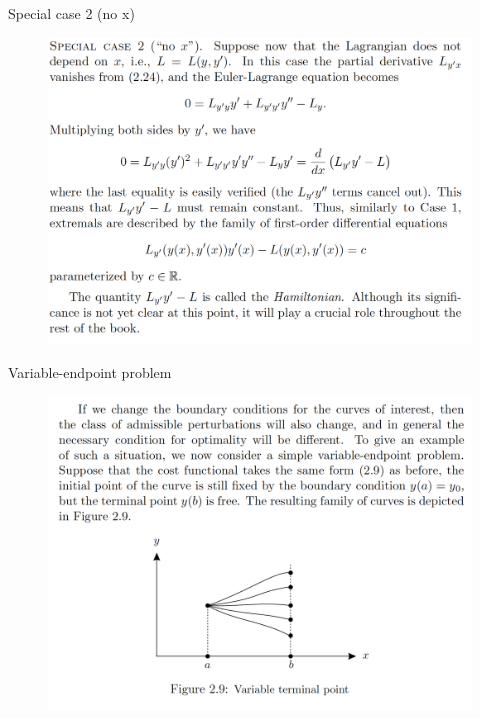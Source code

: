 \documentclass{beamer}
\begin{document}
\begin{frame}{Special case 2 (no x)}
    \begin{figure}
        \centering
        \includegraphics[width=\linewidth]{ch2/fig16.png}
    \end{figure}
\end{frame}

\begin{frame}{Variable-endpoint problem}
    \begin{figure}
        \centering
        \includegraphics[width=\linewidth]{ch2/fig17.png}
    \end{figure}
\end{frame}
\end{document}
